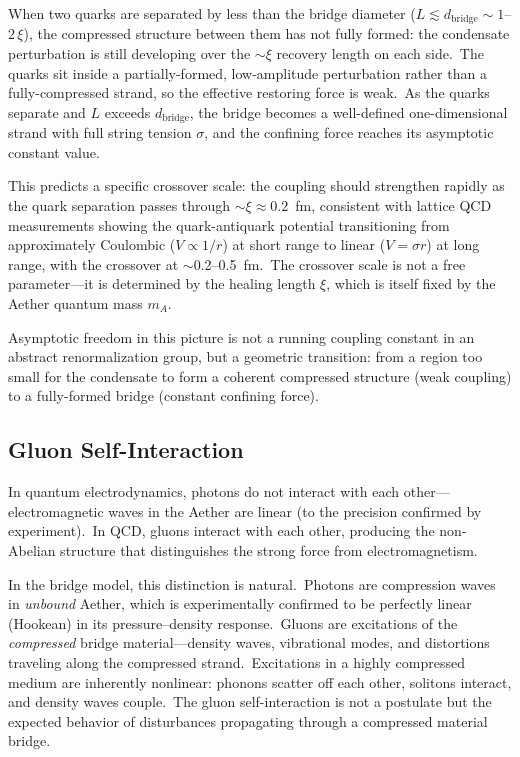 ﻿\documentclass[12pt,letterpaper]{article}
\begin{document}
When two quarks are separated by less than the bridge diameter
($L \lesssim d_{\mathrm{bridge}} \sim 1$--$2\,\xi$), the compressed
structure between them has not fully formed: the condensate perturbation is
still developing over the $\sim\!\xi$ recovery length on each side.\ The
quarks sit inside a partially-formed, low-amplitude perturbation rather than
a fully-compressed strand, so the effective restoring force is weak.\ As the
quarks separate and $L$ exceeds $d_{\mathrm{bridge}}$, the bridge becomes a
well-defined one-dimensional strand with full string tension $\sigma$, and
the confining force reaches its asymptotic constant value.

This predicts a specific crossover scale: the coupling should strengthen
rapidly as the quark separation passes through $\sim\!\xi \approx 0.2$~fm,
consistent with lattice QCD measurements showing the quark-antiquark potential
transitioning from approximately Coulombic ($V \propto 1/r$) at short range
to linear ($V = \sigma r$) at long range, with the crossover at
$\sim$0.2--0.5~fm.\ The crossover scale is not a free parameter---it is
determined by the healing length $\xi$, which is itself fixed by the
Aether quantum mass $m_A$.

Asymptotic freedom in this picture is not a running coupling constant in an
abstract renormalization group, but a geometric transition: from a region too
small for the condensate to form a coherent compressed structure (weak coupling)
to a fully-formed bridge (constant confining force).


\subsection{Gluon Self-Interaction}

In quantum electrodynamics, photons do not interact with each other---electromagnetic
waves in the Aether are linear (to the precision confirmed by experiment).\ In QCD,
gluons interact with each other, producing the non-Abelian structure that distinguishes
the strong force from electromagnetism.

In the bridge model, this distinction is natural.\ Photons are compression waves in
\emph{unbound} Aether, which is experimentally confirmed to be perfectly linear
(Hookean) in its pressure--density response.\ Gluons are excitations of the
\emph{compressed} bridge material---density waves, vibrational modes, and distortions
traveling along the compressed strand.\ Excitations in a highly compressed medium are
inherently nonlinear: phonons scatter off each other, solitons interact, and density
waves couple.\ The gluon self-interaction is not a postulate but the expected behavior
of disturbances propagating through a compressed material bridge.
\end{document}
